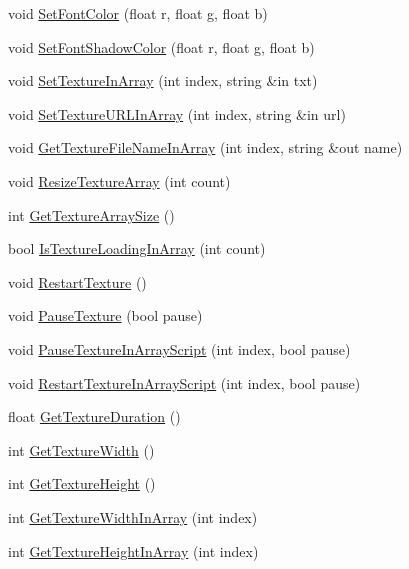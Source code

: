 \begin{DoxyCompactItemize}
\item 
void \hyperlink{class_g_u_i_label_a3977539863dc36bd534219daa63a991c}{Set\+Font\+Color} (float r, float g, float b)
\item 
void \hyperlink{class_g_u_i_label_a003028d9e94f6d52a538595f92d90397}{Set\+Font\+Shadow\+Color} (float r, float g, float b)
\item 
void \hyperlink{class_g_u_i_label_a912bd573d07f939e5a40ef0b094566be}{Set\+Texture\+In\+Array} (int index, string \&in txt)
\item 
void \hyperlink{class_g_u_i_label_ae216a9d23cc634bdf0eed7736f26f6d2}{Set\+Texture\+U\+R\+L\+In\+Array} (int index, string \&in url)
\item 
void \hyperlink{class_g_u_i_label_acd66d930468e451a4bb8ba1363cac68e}{Get\+Texture\+File\+Name\+In\+Array} (int index, string \&out name)
\item 
void \hyperlink{class_g_u_i_label_ac11cef03c8fd58828868ed879fe81790}{Resize\+Texture\+Array} (int count)
\item 
int \hyperlink{class_g_u_i_label_a65d66e0aa600e818b56ed602e2e0dab2}{Get\+Texture\+Array\+Size} ()
\item 
bool \hyperlink{class_g_u_i_label_ab9e51389fe5807258920293f5d71b879}{Is\+Texture\+Loading\+In\+Array} (int count)
\item 
void \hyperlink{class_g_u_i_label_a74e600e9ee18055cbe8e14672df2e909}{Restart\+Texture} ()
\item 
void \hyperlink{class_g_u_i_label_acd661f2d9f4d64e54bb07087bc99d18f}{Pause\+Texture} (bool pause)
\item 
void \hyperlink{class_g_u_i_label_a220fc075b562a29adc12ad2fe8198a49}{Pause\+Texture\+In\+Array\+Script} (int index, bool pause)
\item 
void \hyperlink{class_g_u_i_label_ad2ca36af54cf6f1d2a83cdcfff4b4ea2}{Restart\+Texture\+In\+Array\+Script} (int index, bool pause)
\item 
float \hyperlink{class_g_u_i_label_a5177dd41a756e94d4260f6db3cc1d8d1}{Get\+Texture\+Duration} ()
\item 
int \hyperlink{class_g_u_i_label_a9b7f39a13bcf32c518e7ecac79aab5aa}{Get\+Texture\+Width} ()
\item 
int \hyperlink{class_g_u_i_label_a7dd7f76126c6234d91a41e48a6b16f6d}{Get\+Texture\+Height} ()
\item 
int \hyperlink{class_g_u_i_label_a30459bcd523640b11d278deb5c2824aa}{Get\+Texture\+Width\+In\+Array} (int index)
\item 
int \hyperlink{class_g_u_i_label_a4b45674c2f7151e38e7b811d21988536}{Get\+Texture\+Height\+In\+Array} (int index)

\end{DoxyCompactItemize}
